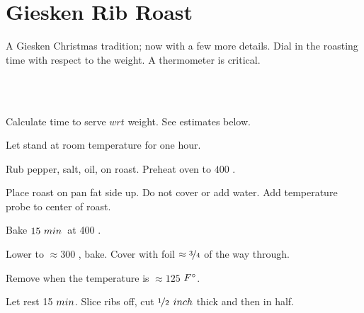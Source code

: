 \section[Rib Roast]{Giesken Rib Roast}


\begin{recipestats}[
	servings=\onehalf~\pound/person,
	preptime=1\onehalf~\hour,
	bakingtime=$\approx4~\hour$,
	inactivetime=1\onehalf~\hour,
	source=Giesken~Family,
]
\end{recipestats}


\begin{recipeabstract}
	A Giesken Christmas tradition; now with a few more details.
	Dial in the roasting time with respect to the weight.
	A thermometer is critical.
\end{recipeabstract}


\begin{ingredientcolumns}[1]
	\begin{ingredientblock}
		\\
		\\
	\end{ingredientblock}
\end{ingredientcolumns}


\begin{preparation}
\item Calculate time to serve $wrt$ weight.
	See estimates below.

\item Let stand at room temperature for one hour.

\item Rub pepper, salt, oil, on roast. Preheat oven to $400$ \Fahrenheit.

\item Place roast on pan fat side up.
	Do not cover or add water.
	Add temperature probe to center of roast.

\item Bake $15~\minute$~at 400 \Fahrenheit.

\item Lower to $\approx 300$ \Fahrenheit, bake.
	Cover with foil $\approx \threefourth$ of the way through.

\item Remove when the temperature is $\approx 125$ $\Fahrenheit$.

\item Let rest 15 $\minute$.
	Slice ribs off, cut $\onehalf$ $\inch$ thick and then in half.

\end{preparation}


